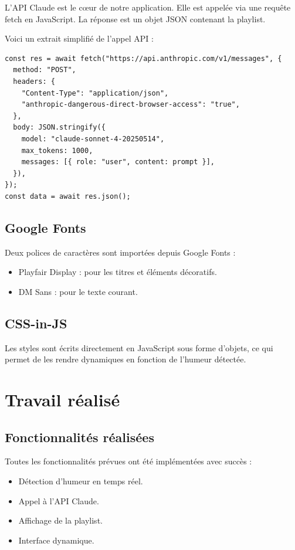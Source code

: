 \documentclass[a4paper, 12pt, twoside]{article}
\begin{document}
L'API Claude est le cœur de notre application. Elle est appelée via une requête fetch en JavaScript. La réponse est un objet JSON contenant la playlist.

Voici un extrait simplifié de l'appel API :

\begin{verbatim}
const res = await fetch("https://api.anthropic.com/v1/messages", {
  method: "POST",
  headers: {
    "Content-Type": "application/json",
    "anthropic-dangerous-direct-browser-access": "true",
  },
  body: JSON.stringify({
    model: "claude-sonnet-4-20250514",
    max_tokens: 1000,
    messages: [{ role: "user", content: prompt }],
  }),
});
const data = await res.json();
\end{verbatim}

\subsection{Google Fonts}

Deux polices de caractères sont importées depuis Google Fonts :

\begin{itemize}
    \item Playfair Display : pour les titres et éléments décoratifs.
    \item DM Sans : pour le texte courant.
\end{itemize}

\subsection{CSS-in-JS}

Les styles sont écrits directement en JavaScript sous forme d'objets, ce qui permet de les rendre dynamiques en fonction de l'humeur détectée.

\section{Travail réalisé}

\subsection{Fonctionnalités réalisées}

Toutes les fonctionnalités prévues ont été implémentées avec succès :

\begin{itemize}
    \item Détection d'humeur en temps réel.
    \item Appel à l'API Claude.
    \item Affichage de la playlist.
    \item Interface dynamique.
\end{itemize}
\end{document}
